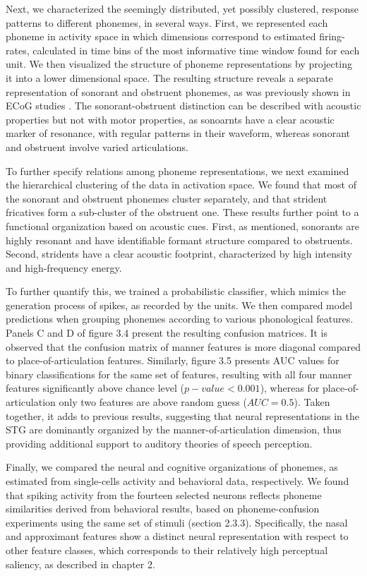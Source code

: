Next, we characterized the seemingly distributed, yet possibly clustered, response patterns to different phonemes, in several ways. First, we represented each phoneme in activity space in which dimensions correspond to estimated firing-rates, calculated in time bins of the most informative time window found for each unit. We then visualized the structure of phoneme representations by projecting it into a lower dimensional space. The resulting structure reveals a separate representation of sonorant and obstruent phonemes, as was previously shown in ECoG studies \citep{Mesgarani2014}. The sonorant-obstruent distinction can be described with acoustic properties but not with motor properties, as sonoarnts have a clear acoustic marker of resonance, with regular patterns in their waveform, whereas sonorant and obstruent involve varied articulations.

To further specify relations among phoneme representations, we next examined the hierarchical clustering of the data in activation space. We found that most of the sonorant and obstruent phonemes cluster separately, and that strident fricatives form a sub-cluster of the obstruent one. These results further point to a functional organization based on acoustic cues. First, as mentioned, sonorants are highly resonant and have identifiable formant structure compared to obstruents. Second, stridents have a clear acoustic footprint, characterized by high intensity and high-frequency energy. 

To further quantify this, we trained a probabilistic classifier, which mimics the generation process of spikes, as recorded by the units. We then compared model predictions when grouping phonemes according to various phonological features. Panels C and D of figure 3.4 present the resulting confusion matrices. It is observed that the confusion matrix of manner features is more diagonal compared to place-of-articulation features. Similarly, figure 3.5 presents AUC values for binary classifications for the same set of features, resulting with all four manner features significantly above chance level ($p-value<0.001$), whereas for place-of-articulation only two features are above random guess ($AUC = 0.5$). Taken together, it adds to previous results, suggesting that neural representations in the STG are dominantly organized by the manner-of-articulation dimension, thus providing additional support to auditory theories of speech perception. 

Finally, we compared the neural and cognitive organizations of phonemes, as estimated from single-cells activity and behavioral data, respectively. We found that spiking activity from the fourteen selected neurons reflects phoneme similarities derived from behavioral results, based on phoneme-confusion experiments using the same set of stimuli (section 2.3.3). Specifically, the nasal and approximant features show a distinct neural representation with respect to other feature classes, which corresponds to their relatively high perceptual saliency, as described in chapter 2.

